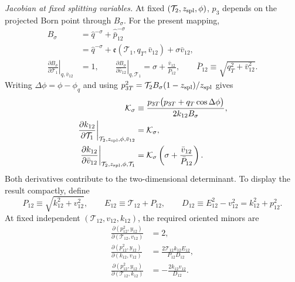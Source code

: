 \documentclass[11pt]{article}
\begin{document}
\medskip
\noindent
\textit{Jacobian at fixed splitting variables.}
At fixed $(\mathcal T_2,z_{\rm spl},\phi)$, $p_3$ depends on the projected Born point through
$B_\sigma$.  For the present mapping,
\begin{align}
B_\sigma
&=
\hat q^{-\sigma}+\hat{\bar p}_{12}^{-\sigma}
\nonumber\\
&=
\hat q^{-\sigma}
+\mathfrak e(\mathcal T_1,q_T,\bar v_{12})
+\sigma\bar v_{12},
\label{eq:isrfsr-zrepair-B-function}
\\
\left.
\frac{\partial B_\sigma}{\partial\mathcal T_1}
\right|_{q,\bar v_{12}}
&=1,
\qquad
\left.
\frac{\partial B_\sigma}{\partial\bar v_{12}}
\right|_{q,\mathcal T_1}
=
\sigma+\frac{\bar v_{12}}{\bar P_{12}},
\qquad
\bar P_{12}\equiv\sqrt{q_T^2+\bar v_{12}^2}.
\label{eq:isrfsr-zrepair-B-derivative}
\end{align}
Writing $\Delta\phi=\phi-\phi_q$ and using
$p_{3T}^2=\mathcal T_2B_\sigma(1-z_{\rm spl})/z_{\rm spl}$ gives
\begin{align}
\mathcal K_\sigma
&\equiv
\frac{
p_{3T}\bigl(p_{3T}+q_T\cos\Delta\phi\bigr)
}{
2k_{12}B_\sigma
},
\label{eq:isrfsr-zrepair-K-definition}
\\
\left.
\frac{\partial k_{12}}{\partial\mathcal T_1}
\right|_{\mathcal T_2,z_{\rm spl},\phi,\bar v_{12}}
&=\mathcal K_\sigma,
\nonumber\\
\left.
\frac{\partial k_{12}}{\partial\bar v_{12}}
\right|_{\mathcal T_2,z_{\rm spl},\phi,\mathcal T_1}
&=
\mathcal K_\sigma
\left(
\sigma+\frac{\bar v_{12}}{\bar P_{12}}
\right).
\label{eq:isrfsr-zrepair-k-derivative}
\end{align}
Both derivatives contribute to the two-dimensional determinant.  To display the result compactly, define
\begin{equation}
P_{12}\equiv\sqrt{k_{12}^2+v_{12}^2},
\qquad
E_{12}\equiv\mathcal T_{12}+P_{12},
\qquad
D_{12}\equiv E_{12}^2-v_{12}^2
=k_{12}^2+p_{12}^2.
\label{eq:isrfsr-zrepair-PED-definitions}
\end{equation}
At fixed independent $(\mathcal T_{12},v_{12},k_{12})$, the required oriented minors are
\begin{align}
\frac{\partial(p_{12}^2,y_{12})}
{\partial(\mathcal T_{12},v_{12})}
&=2,
\nonumber\\
\frac{\partial(p_{12}^2,y_{12})}
{\partial(k_{12},v_{12})}
&=
\frac{2\mathcal T_{12}k_{12}E_{12}}{P_{12}D_{12}},
\nonumber\\
\frac{\partial(p_{12}^2,y_{12})}
{\partial(\mathcal T_{12},k_{12})}
&=
-\frac{2k_{12}v_{12}}{D_{12}}.
\label{eq:isrfsr-zrepair-jacobian-minors}
\end{align}
\end{document}
